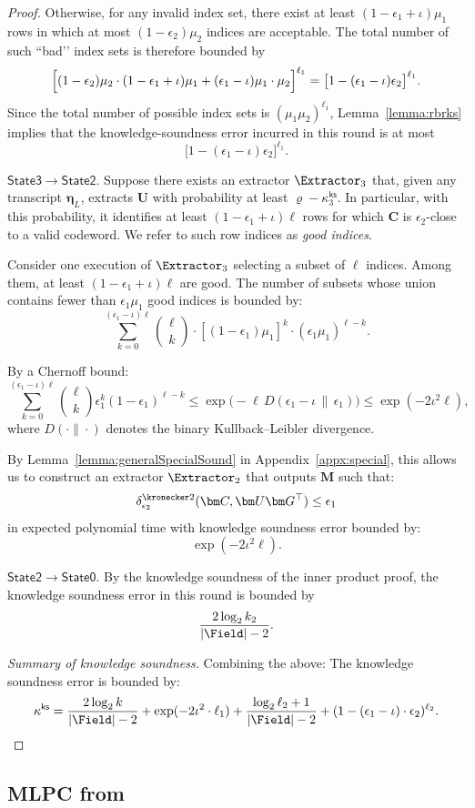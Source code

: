 \begin{proof}
Otherwise, for any invalid index set, there exist at least
$(1-\epsilon_1+\iota)\mu_1$ rows in which at most
$(1-\epsilon_2)\mu_2$ indices are acceptable.
The total number of such “bad’’ index sets is therefore bounded by
\[
    \Bigl[
        (1-\epsilon_2)\mu_2 \cdot (1-\epsilon_1+\iota)\mu_1
        + (\epsilon_1-\iota)\mu_1 \cdot \mu_2
    \Bigr]^{\ell_1}
    = \bigl[1-(\epsilon_1-\iota)\epsilon_2\bigr]^{\ell_1}.
\]
Since the total number of possible index sets is $(\mu_1\mu_2)^{\ell_1}$,
Lemma~\ref{lemma:rbrks} implies that the knowledge-soundness error
incurred in this round is at most
\[
    \bigl[1-(\epsilon_1-\iota)\epsilon_2\bigr]^{\ell_1}.
\]


\noindent
{\sf $\mathsf{State3} \rightarrow \mathsf{State2}$.}
Suppose there exists an extractor $\Extractor_3$ that,
given any transcript $\bm{\eta}_L$,
extracts $\bm U$ with probability at least
$\varrho - \kappa^{\mathsf{ks}}_3$.
In particular, with this probability,
it identifies at least $(1-\epsilon_1+\iota)\ell$ rows
for which $\bm C$ is $\epsilon_2$-close to a valid codeword.
We refer to such row indices as \emph{good indices}.

Consider one execution of $\Extractor_3$ selecting
a subset of $\ell$ indices.
Among them, at least $(1-\epsilon_1+\iota)\ell$
are good.
The number of subsets whose union contains
fewer than $\epsilon_1 \mu_1$ good indices
is bounded by:
\[
\sum_{k=0}^{(\epsilon_1-\iota)\ell}
\binom{\ell}{k}
\cdot
[(1-\epsilon_1)\mu_1]^k
\cdot
(\epsilon_1 \mu_1)^{\ell-k}.
\]

By a Chernoff bound:
\[
\sum_{k=0}^{(\epsilon_1-\iota)\ell}
\binom{\ell}{k}
\epsilon_1^k
(1-\epsilon_1)^{\ell-k}
\le
\exp\!\big(-\ell \, D(\epsilon_1-\iota \,\|\, \epsilon_1)\big)
\le
\exp(-2\iota^2 \ell),
\]
where $D(\cdot\|\cdot)$ denotes the binary
Kullback–Leibler divergence.

By Lemma~\ref{lemma:generalSpecialSound} in Appendix~\ref{appx:special},
this allows us to construct an extractor
$\Extractor_2$
that outputs $\bm M$ such that:
\[
\delta^{\kronecker 2}_{\epsilon_2}
(\bm C, \bm U \bm G^\top)
\le
\epsilon_1
\]
in expected polynomial time with knowledge soundness error
bounded by:
\[
\exp(-2\iota^2 \ell).
\]

\smallskip
\noindent
{\sf $\mathsf{State2} \rightarrow \mathsf{State0}$.}
By the knowledge soundness of the inner product proof,
the knowledge soundness error in this round is bounded by
\[
    \frac{2\log_2 k_2}{|\Field|-2}.
\]

\smallskip
\noindent
{\em Summary of knowledge soundness.}
Combining the above:
The knowledge soundness error is bounded by:
\[
    \kappa^\mathsf{ks} = 
    \frac{2\log_2 k}{|\Field|-2} + \exp(-2\iota^2 \cdot \ell_1)  +  \frac{\log_2 \ell_2 +1}{|\Field|-2} + (1-(\epsilon_1 - \iota)\cdot \epsilon_2)^{\ell_2}.
    \qedhere
\]
\end{proof}



\subsection{MLPC from \methodname}
\label{sec:mlpc}
